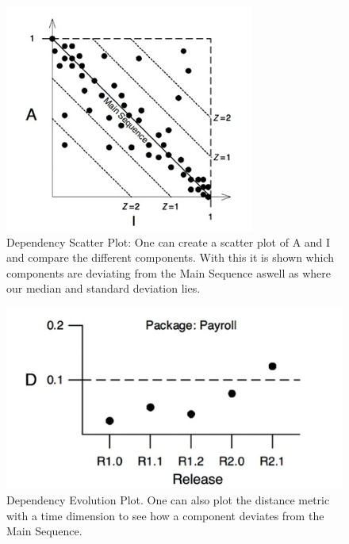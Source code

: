 \documentclass[../Main.tex]{subfiles}
\begin{document}
\begin{figure}[H]
    \centering
    \includegraphics[width=0.75\linewidth]{Images/cleanarch/dependency-scatter.png}
    \caption{
        Dependency Scatter Plot:
        One can create a scatter plot of A and I and compare the different components.
        With this it is shown which components are deviating from the Main Sequence aswell as
        where our median and standard deviation lies.
    }
\end{figure}

\begin{figure}[H]
    \centering
    \includegraphics[width=0.75\linewidth]{Images/cleanarch/dependency-evolution.png}
    \caption{
        Dependency Evolution Plot.
        One can also plot the distance metric with a time dimension to see how a component
        deviates from the Main Sequence.
    }
\end{figure}
\end{document}
